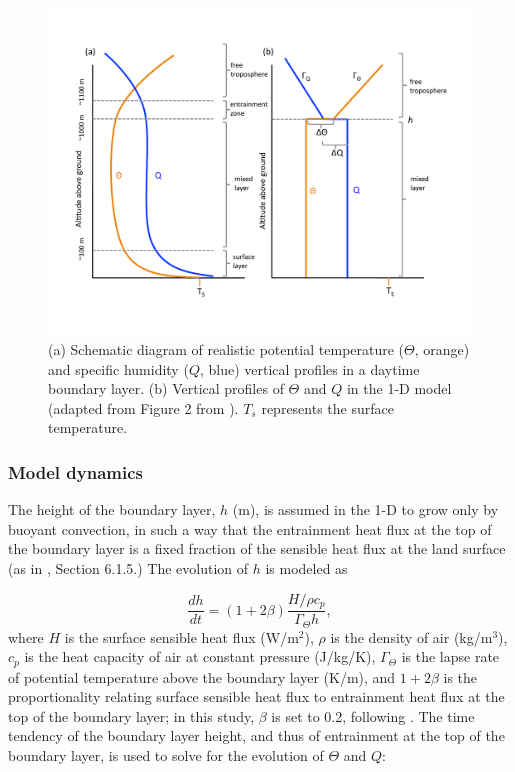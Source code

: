 \begin{figure}[here]
\includegraphics[width=1\textwidth]{ch2-BL/figures/schematic_mixed_layer.pdf}
\caption{(a) Schematic diagram of realistic potential temperature ($\Theta$, orange) and specific humidity ($Q$, blue) vertical profiles in a  daytime boundary layer.  (b) Vertical profiles of $\Theta$ and $Q$ in the 1-D model (adapted from Figure 2 from \cite{Siqueira:2009qf}).  $T_s$ represents the surface temperature.}
\label{fig:BL_schematic}
\end{figure}

\subsubsection{Model dynamics}
The height of the boundary layer, $h$ (m), is assumed in the 1-D to grow only by buoyant convection, in such a way that the entrainment heat flux at the top of the boundary layer is a fixed fraction of the sensible heat flux at the land surface (as in \cite{garratt1994atmospheric}, Section 6.1.5.)  The evolution of $h$ is modeled as

\begin{equation}
\frac{dh}{dt} = (1+2\beta)\frac{H/\rho c_p}{\Gamma_\Theta h},
\label{eqn:dhdt}
\end{equation}
where $H$ is the surface sensible heat flux (W/m$^2$), $\rho$ is the density of air (kg/m$^3$), $c_p$ is the heat capacity of air at constant pressure (J/kg/K), $\Gamma_\Theta$ is the lapse rate of potential temperature above the boundary layer (K/m), and $1+2\beta$ is the proportionality relating surface sensible heat flux to entrainment heat flux at the top of the boundary layer; in this study, $\beta$ is set to 0.2, following \cite{garratt1994atmospheric}.  The time tendency of the boundary layer height, and thus of entrainment at the top of the boundary layer, is used to solve for the evolution of $\Theta$ and $Q$:

